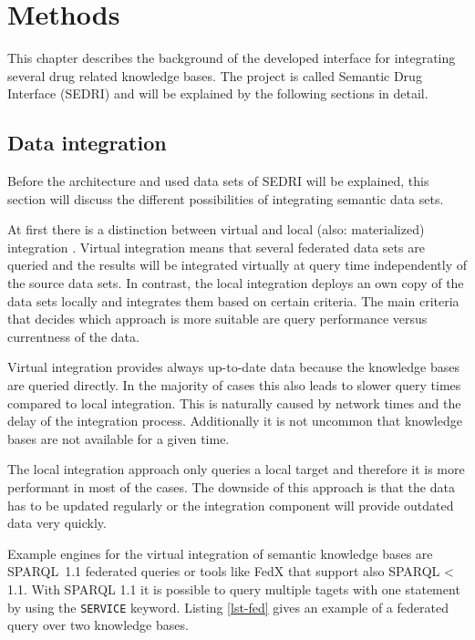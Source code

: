 \chapter{Methods}
\label{cha:methods}

This chapter describes the background of the developed interface for integrating several drug related knowledge bases.
The project is called Semantic Drug Interface (SEDRI) and will be explained by the following sections in detail.

\section{Data integration}
\label{sec:data-integration}

Before the architecture and used data sets of SEDRI will be explained, this section will discuss the different possibilities of integrating semantic data sets.

At first there is a distinction between virtual and local (also: materialized) integration \cite{lenzerini2002data}.
Virtual integration means that several federated data sets are queried and the results will be integrated virtually at query time independently of the source data sets.
In contrast, the local integration deploys an own copy of the data sets locally and integrates them based on certain criteria.
The main criteria that decides which approach is more suitable are query performance versus currentness of the data.

Virtual integration provides always up-to-date data because the knowledge bases are queried directly.
In the majority of cases this also leads to slower query times compared to local integration.
This is naturally caused by network times and the delay of the integration process.
Additionally it is not uncommon that knowledge bases are not available for a given time.

The local integration approach only queries a local target and therefore it is more performant in most of the cases.
The downside of this approach is that the data has to be updated regularly or the integration component will provide outdated data very quickly.

Example engines for the virtual integration of semantic knowledge bases are SPARQL~1.1 federated queries or tools like FedX \cite{schwarte2011fedx} that support also SPARQL < 1.1.
With SPARQL 1.1 it is possible to query multiple tagets with one statement by using the \texttt{SERVICE} keyword.
Listing \ref{lst-fed} gives an example of a federated query over two knowledge bases.

